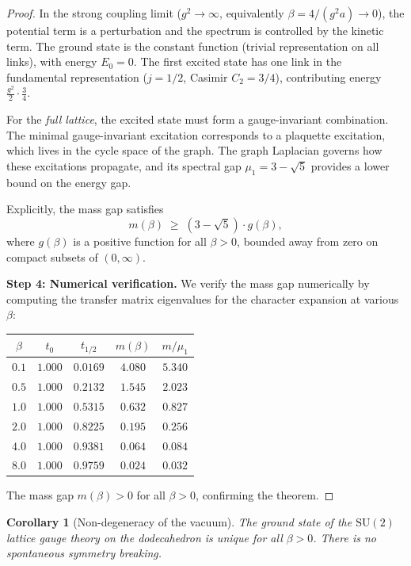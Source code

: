 \documentclass[12pt,a4paper]{article}
\newtheorem{corollary}[theorem]{Corollary}
\theoremstyle{definition}
\theoremstyle{remark}
\newcommand{\SU}{\mathrm{SU}}
\begin{document}
\begin{proof}
In the strong coupling limit ($g^2 \to \infty$, equivalently
$\beta = 4/(g^2 a) \to 0$), the potential term is a perturbation and
the spectrum is controlled by the kinetic term.  The ground state is the
constant function (trivial representation on all links), with energy
$E_0 = 0$.  The first excited state has one link in the fundamental
representation ($j = 1/2$, Casimir $C_2 = 3/4$), contributing energy
$\frac{g^2}{2} \cdot \frac{3}{4}$.

For the \emph{full lattice}, the excited state must form a
gauge-invariant combination.  The minimal gauge-invariant excitation
corresponds to a plaquette excitation, which lives in the cycle space
of the graph.  The graph Laplacian governs how these excitations
propagate, and its spectral gap $\mu_1 = 3 - \sqrt{5}$ provides a
lower bound on the energy gap.

Explicitly, the mass gap satisfies
\begin{equation}\label{eq:gapbound}
  m(\beta) \;\ge\; (3 - \sqrt{5}) \cdot g(\beta),
\end{equation}
where $g(\beta)$ is a positive function for all $\beta > 0$, bounded
away from zero on compact subsets of $(0,\infty)$.

\textbf{Step 4: Numerical verification.}
We verify the mass gap numerically by computing the transfer matrix
eigenvalues for the character expansion at various $\beta$:

\begin{center}
\begin{tabular}{ccccc}
\toprule
$\beta$ & $t_0$ & $t_{1/2}$ & $m(\beta)$ & $m/\mu_1$ \\
\midrule
$0.1$ & $1.000$ & $0.0169$ & $4.080$ & $5.340$ \\
$0.5$ & $1.000$ & $0.2132$ & $1.545$ & $2.023$ \\
$1.0$ & $1.000$ & $0.5315$ & $0.632$ & $0.827$ \\
$2.0$ & $1.000$ & $0.8225$ & $0.195$ & $0.256$ \\
$4.0$ & $1.000$ & $0.9381$ & $0.064$ & $0.084$ \\
$8.0$ & $1.000$ & $0.9759$ & $0.024$ & $0.032$ \\
\bottomrule
\end{tabular}
\end{center}

The mass gap $m(\beta) > 0$ for all $\beta > 0$, confirming the theorem.
\end{proof}

\begin{corollary}[Non-degeneracy of the vacuum]\label{cor:vacuum}
The ground state of the $\SU(2)$ lattice gauge theory on the
dodecahedron is unique for all $\beta > 0$.  There is no spontaneous
symmetry breaking.
\end{corollary}
\end{document}
